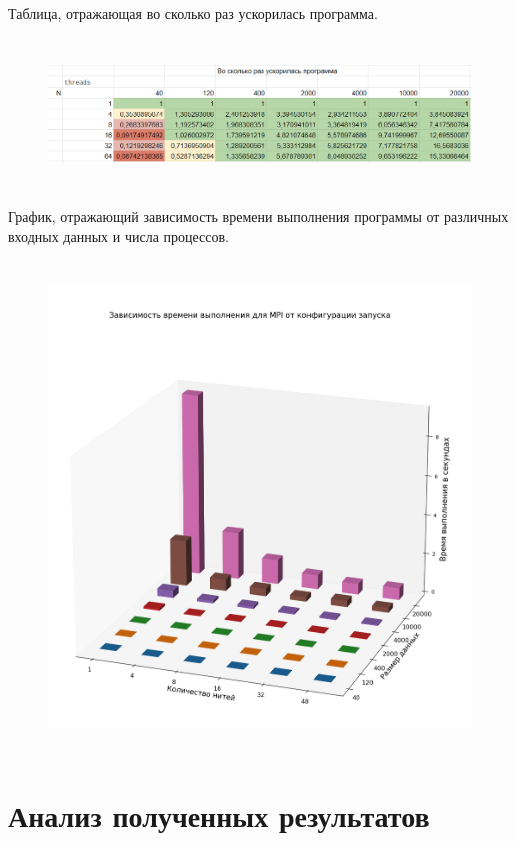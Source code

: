 \documentclass{article}
\begin{document}
Таблица, отражающая во сколько раз ускорилась программа.

\begin{figure}[H]
    \centering
    \includegraphics[width=13cm,height=4cm]{mpi_speed_up.png}
\end{figure}

\newpage

График, отражающий зависимость времени выполнения программы от различных входных данных и числа процессов.

\begin{figure}[H]
    \centering
    \includegraphics[scale = 0.35,width=15cm,height=13cm]{mpi_plot.png}
\end{figure}

\section{Анализ полученных результатов}
\end{document}

